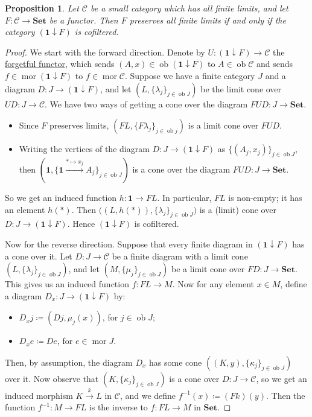 \documentclass[a4paper,11pt]{article}
\theoremstyle{break_italics}
\newtheorem*{proposition*}{Proposition}
\theoremstyle{break_upright}
\theoremstyle{remark}
\newcommand{\ob}{\operatorname{ob}}
\newcommand{\mor}{\operatorname{mor}}
\newcommand{\C}{\mathcal{C}}
\newcommand{\Set}{\mathbf{Set}}
\begin{document}
\begin{proposition*}
	Let $\C$ be a small category which has all finite limits, and let $F \colon \C \to \Set$ be a functor. Then $F$ preserves all finite limits if and only if the category $(\mathbf 1 \downarrow F)$ is cofiltered.
\end{proposition*}
\begin{proof}
	We start with the forward direction. Denote by $U \colon (\mathbf 1 \downarrow F) \to \C$ the \uline{forgetful functor}, which sends $(A,x) \in \ob(\mathbf 1 \downarrow F)$ to $A \in \ob\C$ and sends $f \in \mor(\mathbf 1 \downarrow F)$ to $f \in \mor\C$. Suppose we have a finite category $J$ and a diagram $D \colon J \to (\mathbf 1 \downarrow F)$, and let $(L, \{\lambda_j\}_{j\in\ob J})$ be the limit cone over $UD \colon J \to \C$. We have two ways of getting a cone over the diagram $FUD \colon J \to \Set$.
	\begin{itemize}
		\item Since $F$ preserves limits, $(FL, \{F\lambda_j\}_{j\in\ob j})$ is a limit cone over $FUD$.
		\item Writing the vertices of the diagram $D \colon J \to (\mathbf 1 \downarrow F)$ as $\{(A_j, x_j)\}_{j \in \ob J}$, then $(\mathbf 1, \{\mathbf 1 \xrightarrow{* \mapsto x_j} A_j\}_{j\in\ob J})$ is a cone over the diagram $FUD \colon J \to \Set$.
	\end{itemize}
	So we get an induced function $h \colon \mathbf 1 \to FL$. In particular, $FL$ is non-empty; it has an element $h(*)$. Then $\big((L, h(*)), \{\lambda_j\}_{j\in\ob J}\big)$ is a (limit) cone over $D \colon J \to (\mathbf 1 \downarrow F)$. Hence $(\mathbf 1 \downarrow F)$ is cofiltered.
	
	Now for the reverse direction. Suppose that every finite diagram in $(\mathbf 1 \downarrow F)$ has a cone over it. Let $D \colon J \to \C$ be a finite diagram with a limit cone $(L, \{\lambda_j\}_{j\in\ob J})$, and let $(M, \{\mu_j\}_{j \in \ob J})$ be a limit cone over $FD \colon J \to \Set$. This gives us an induced function $f \colon FL \to M$. Now for any element $x \in M$, define a diagram $D_x \colon J \to (\mathbf 1 \downarrow F)$ by:
	\begin{itemize}
		\item $D_x j \coloneqq (Dj, \mu_j(x))$, for $j \in \ob J$;
		\item $D_x e \coloneqq De$, for $e \in \mor J$.
	\end{itemize}
	Then, by assumption, the diagram $D_x$ has some cone $((K, y), \{\kappa_j\}_{j\in\ob J})$ over it. Now observe that $(K, \{\kappa_j\}_{j \in \ob J})$ is a cone over $D \colon J \to \C$, so we get an induced morphism $K \xrightarrow{k} L$ in $\C$, and we define $f^{-1}(x) \coloneqq (Fk)(y)$. Then the function $f^{-1} \colon M \to FL$ is the inverse to $f \colon FL \to M$ in $\Set$.
\end{proof}
\end{document}
